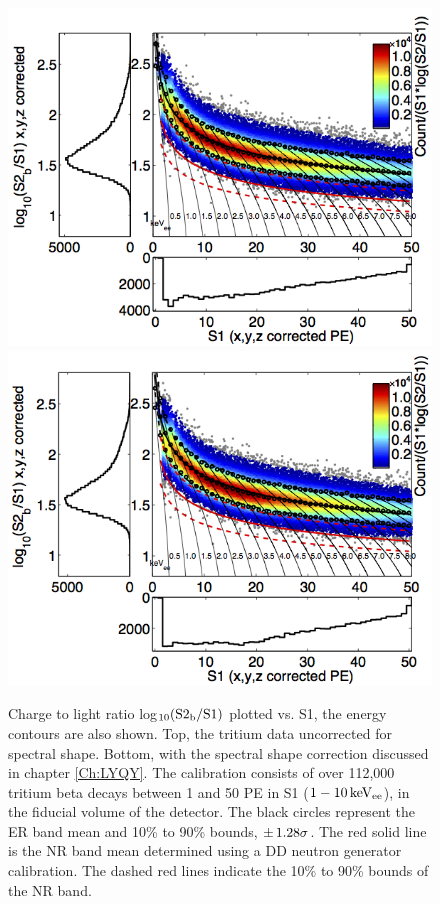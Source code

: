 \begin{figure}[p!]\centering
\includegraphics[width=120mm]{Chapter_T/Figures/ER_Band/CH3T_fid_50_rawSpec.png}
\includegraphics[width=120mm]{Chapter_T/Figures/ER_Band/CH3T_fid_50_proj.png}
\caption{Charge to light ratio log$\rm _{10}(S2_b/S1)$ plotted vs. S1, the energy contours are also shown. Top, the tritium data uncorrected for spectral shape. Bottom, with the spectral shape correction discussed in chapter \ref{Ch:LYQY}. The calibration consists of over 112,000 tritium beta decays between 1 and 50 PE in S1 ($\rm1-10 \, keV_{ee}$), in the fiducial volume of the detector. The black circles represent the ER band mean and 10\% to 90\% bounds, $\rm \pm \,1.28\sigma$. The red solid line is the NR band mean determined using a DD neutron generator calibration. The dashed red lines indicate the 10\% to 90\% bounds of the NR band.}
\label{fig:Band}
\end{figure}
\renewcommand{\baselinestretch}{2}
\small\normalsize

